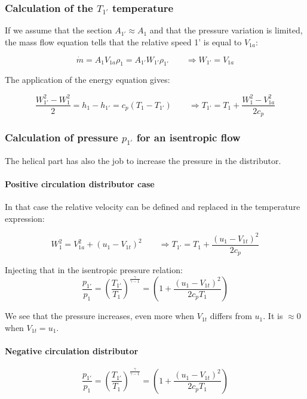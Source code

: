 \subsubsection{Calculation of the $T_{1'}$ temperature}
If we assume that the section $A_{1'} \approx A_1$ and that the pressure variation is limited, the mass flow equation tells that the relative speed 1' is equal to $V_{1a}$: 

\begin{equation}
\dot{m} = A_1V_{1a}\rho _1 = A_{1'}W_{1'}\rho _{1'} \qquad \Rightarrow W_{1'}= V_{1a}
\end{equation}

The application of the energy equation gives: 

\begin{equation}
\frac{W_{1'}^2-W_1^2}{2} = h_1 - h_{1'} = c_p(T_1-T_{1'})\qquad \Rightarrow T_{1'} = T_1 + \frac{W_1^2 - V_{1a}^2}{2c_p}
\end{equation}

\subsubsection{Calculation of pressure $p_{1'}$ for an isentropic flow}
The helical part has also the job to increase the pressure in the distributor. 

\paragraph{Positive circulation distributor case}
In that case the relative velocity can be defined and replaced in the temperature expression: 

\begin{equation}
W_1^2 = V_{1a}^2 + (u_1-V_{1t})^2\qquad \Rightarrow T_{1'} = T_1 + \frac{(u_1-V_{1t})^2}{2c_p}
\end{equation}

Injecting that in the isentropic pressure relation: 
\begin{equation}
\frac{p_{1'}}{p_1} = \left(\frac{T_{1'}}{T_1} \right)^{\frac{\gamma}{\gamma -1}} = \left( 1 + \frac{(u_1-V_{1t})^2}{2c_pT_1} \right)
\end{equation}

We see that the pressure increases, even more when $V_{1t}$ differs from $u_1$. It is $\approx 0$ when $V_{1t} = u_1$. 

\paragraph{Negative circulation distributor}
\begin{equation}
\frac{p_{1'}}{p_1} = \left(\frac{T_{1'}}{T_1} \right)^{\frac{\gamma}{\gamma -1}} = \left( 1 + \frac{(u_1-V_{1t})^2}{2c_pT_1} \right)
\end{equation}

